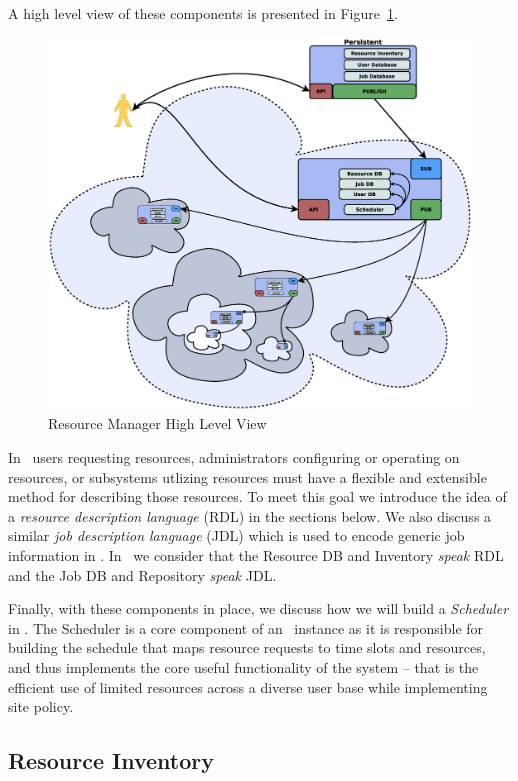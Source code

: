 A high level view of these components is presented in Figure~\ref{RMComponents}.

\begin{figure}
\centering
\includegraphics[scale=0.20]{../fig/RM-full.eps}
\caption{Resource Manager High Level View}
\label{RMComponents}
\end{figure}

In \ngrm\ users requesting resources, administrators configuring
or operating on resources, or subsystems utlizing resources
must have a flexible and extensible method for describing those
resources.  To meet this goal we introduce the idea of a {\em
resource description language} (RDL) in the sections below. We
also discuss a similar {\em job description language} (JDL) which
is used to encode generic job information in \ngrm. In \ngrm\
we consider that the Resource DB and Inventory {\em speak} RDL
and the Job DB and Repository {\em speak} JDL.

Finally, with these components in place, we discuss how we will
build a {\em Scheduler} in \ngrm. The Scheduler is a core component
of an \ngrm\ instance as it is responsible for building the schedule
that maps resource requests to time slots and resources, and thus
implements the core useful functionality of the system -- that is the
efficient use of limited resources across a diverse user base while
implementing site policy.

\subsection{Resource Inventory}

